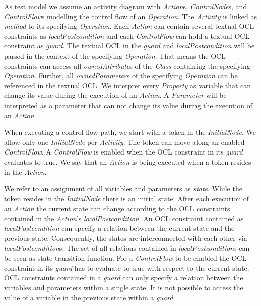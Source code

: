 \documentclass[runningheads,a4paper]{llncs}%
\newcommand{\UMLType}[1]{\textsf{\textit{#1}}} %
\newcommand{\UMLReference}[1]{\textsf{\textit{#1}}} %
\begin{document}
As test model we assume an activity diagram with \UMLType{Action}s,
\UMLType{ControlNode}s, and \UMLType{ControlFlow}s modelling the control flow of
an \UMLType{Operation}. The \UMLType{Activity} is linked as
\UMLReference{method} to its specifying \UMLType{Operation}. Each
\UMLType{Action} can contain several textual OCL constraints as
\UMLReference{localPostcondition} and each \UMLType{ControlFlow} can hold a
textual OCL constraint as \UMLReference{guard}. The textual OCL in the
\UMLReference{guard} and \UMLReference{localPostcondition} will be parsed in the
context of the specifying \UMLType{Operation}. That means the OCL constraints
can access all \UMLReference{ownedAttribute}s of the \UMLType{Class} containing
the specifying \UMLType{Operation}. Further, all \UMLReference{ownedParameter}s
of the specifying \UMLType{Operation} can be referenced in the textual OCL. We
interpret every \UMLType{Property} as variable that can change its value during
the execution of an \UMLType{Action}. A \UMLType{Parameter} will be interpreted
as a parameter that can not change its value during the execution of an
\UMLType{Action}.

When executing a control flow path, we start with a token in the
\UMLType{InitialNode}. We allow only one \UMLType{InitialNode} per
\UMLType{Activity}. The token can move along an enabled \UMLType{ControlFlow}. A
\UMLType{ControlFlow} is enabled when the OCL constraint in its
\UMLReference{guard} evaluates to true. We say that an \UMLType{Action} is being
executed when a token resides in the \UMLType{Action}.

We refer to an assignment of all variables and parameters as \emph{state}. While
the token resides in the \UMLType{InitialNode} there is an initial state. After
each execution of an \UMLType{Action} the current state can change according to
the OCL constraints contained in the \UMLType{Action}'s
\UMLReference{localPostcondition}. An OCL constraint contained as
\UMLType{localPostcondition} can specify a relation between the current state
and the previous state. Consequently, the states are interconnected with each
other via \UMLReference{localPostcondition}s. The set of all relations contained
in \UMLType{localPostcondition}s can be seen as state transition function. For a
\UMLType{ControlFlow} to be enabled the OCL constraint in its
\UMLReference{guard} has to evaluate to true with respect to the current state.
OCL constraints contained in a \UMLReference{guard} can only specify a relation
between the variables and parameters within a single state. It is not possible
to access the value of a variable in the previous state within a
\UMLReference{guard}.
%
\end{document}
